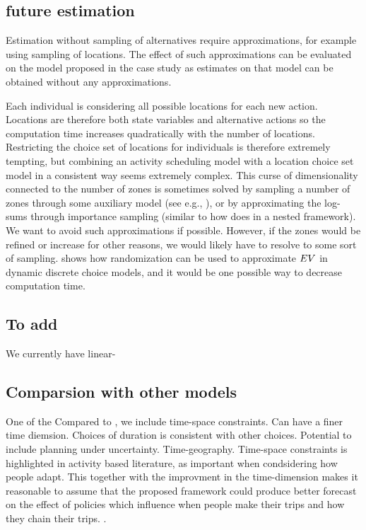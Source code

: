 \subsection{future estimation}
Estimation without sampling of alternatives require approximations, for example using sampling of locations. The effect of such approximations can be evaluated on the model proposed in the case study as estimates on that model can be obtained without any approximations. %

Each individual is considering all possible locations for each new action. Locations are therefore both state variables and alternative actions so the computation time increases quadratically with the number of locations. Restricting the choice set of locations for individuals is therefore extremely tempting, but combining an activity scheduling model with a location choice set model in a consistent way seems extremely complex. This curse of dimensionality connected to the number of zones is sometimes solved by sampling a number of zones through some auxiliary model (see e.g., \citep{liao13}), or by approximating the log-sums through importance sampling (similar to how \citealt{Bradley10} does in a nested framework). We want to avoid such approximations if possible. However, if the zones would be refined or increase for other reasons, we would likely have to resolve to some sort of sampling. \citet{Rust97} shows how randomization can be used to approximate $EV$ in dynamic discrete choice models, and it would be one possible way to decrease computation time.

\subsection{To add}

We currently have linear-

\subsection{Comparsion with other models}

One of the 
Compared to \citet{Bowman01}, we include time-space constraints. Can have a finer time diemsion. Choices of duration is consistent with other choices. Potential to include planning under uncertainty. Time-geography.  
Time-space constraints is highlighted in activity based literature, as important when condsidering how people adapt. This together with the improvment in the time-dimension makes it reasonable to assume that the proposed framework could produce better forecast on the effect of policies which influence when people make their trips and how they chain their trips. 
. 

